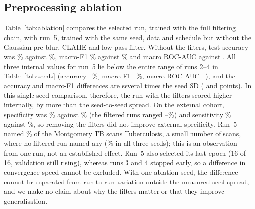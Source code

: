 \subsection{Preprocessing ablation}
\label{sec:res-ablation}
Table~\ref{tab:ablation} compares the selected run, trained with the full filtering chain, with run~5, trained with the same seed, data and schedule but without the Gaussian pre-blur, CLAHE and low-pass filter. Without the filters, test accuracy was \RAblTestAcc\% against \RMSRunOneTestAcc\%, macro-F1 \RAblTestMacroFOne\% against \RMSRunOneTestMacroFOne\% and macro ROC-AUC \RAblTestMacroAUC{} against \RMSRunOneTestMacroAUC. All three internal values for run~5 lie below the entire range of runs 2--4 in Table~\ref{tab:seeds} (accuracy \RMSTestAccMin--\RMSTestAccMax\%, macro-F1 \RMSTestMacroFOneMin--\RMSTestMacroFOneMax\%, macro ROC-AUC \RMSTestMacroAUCMin--\RMSTestMacroAUCMax), and the accuracy and macro-F1 differences are several times the seed SD (\RMSTestAccSD{} and \RMSTestMacroFOneSD{} points). In this single-seed comparison, therefore, the run with the filters scored higher internally, by more than the seed-to-seed spread. On the external cohort, specificity was \RAblExtSpec\% against \RMSRunOneExtSpec\% (the filtered runs ranged \RMSExtSpecMin--\RMSExtSpecMax\%) and sensitivity \RAblExtSens\% against \RMSRunOneExtSens\%, so removing the filters did not improve external specificity. Run~5 named \RAblExtTB\% of the Montgomery TB scans Tuberculosis, a small number of scans, where no filtered run named any (\RMSExtTBMean\% in all three seeds); this is an observation from one run, not an established effect. Run~5 also selected its last epoch (16 of 16, validation still rising), whereas runs 3 and 4 stopped early, so a difference in convergence speed cannot be excluded. With one ablation seed, the difference cannot be separated from run-to-run variation outside the measured seed spread, and we make no claim about why the filters matter or that they improve generalisation.

